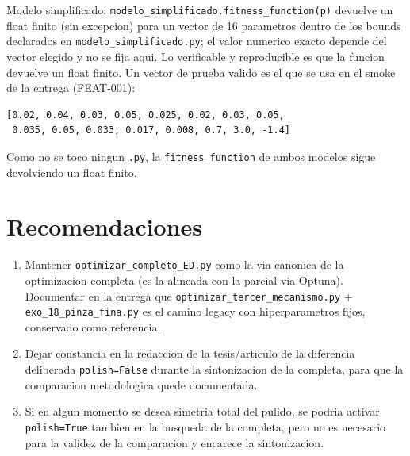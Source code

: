 \documentclass[11pt,a4paper]{article}
\newcommand{\code}[1]{\texttt{#1}}
\begin{document}
Modelo simplificado: \code{modelo\_simplificado.fitness\_function(p)} devuelve un
float finito (sin excepcion) para un vector de 16 parametros dentro de los bounds
declarados en \code{modelo\_simplificado.py}; el valor numerico exacto depende
del vector elegido y no se fija aqui. Lo verificable y reproducible es que la
funcion devuelve un float finito. Un vector de prueba valido es el que se usa en
el smoke de la entrega (FEAT-001):

\begin{verbatim}
[0.02, 0.04, 0.03, 0.05, 0.025, 0.02, 0.03, 0.05,
 0.035, 0.05, 0.033, 0.017, 0.008, 0.7, 3.0, -1.4]
\end{verbatim}

Como no se toco ningun \code{.py}, la \code{fitness\_function} de ambos modelos
sigue devolviendo un float finito.

\section{Recomendaciones}

\begin{enumerate}[leftmargin=1.6em]
  \item Mantener \code{optimizar\_completo\_ED.py} como la via canonica de la
        optimizacion completa (es la alineada con la parcial via Optuna).
        Documentar en la entrega que \code{optimizar\_tercer\_mecanismo.py} +
        \code{exo\_18\_pinza\_fina.py} es el camino legacy con hiperparametros
        fijos, conservado como referencia.
  \item Dejar constancia en la redaccion de la tesis/articulo de la diferencia
        deliberada \code{polish=False} durante la sintonizacion de la completa,
        para que la comparacion metodologica quede documentada.
  \item Si en algun momento se desea simetria total del pulido, se podria activar
        \code{polish=True} tambien en la busqueda de la completa, pero no es
        necesario para la validez de la comparacion y encarece la sintonizacion.
\end{enumerate}
\end{document}
